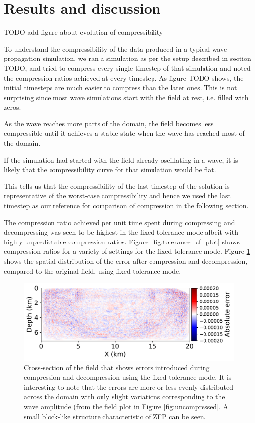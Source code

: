 \section{Results and discussion}
\label{sec:results}

TODO add figure about evolution of compressibility 

To understand the compressibility of the data produced in a typical
wave-propagation simulation, we ran a simulation as per the setup
described in section TODO, and tried to compress every single timestep
of that simulation and noted the compression ratios achieved at every
timestep. As figure TODO shows, the initial timesteps are much easier
to compress than the later ones. This is not surprising since most
wave simulations start with the field at rest, i.e. filled with zeros.

As the wave reaches more parts of the domain, the field becomes less
compressible until it achieves a stable state when the wave has
reached most of the domain. 

If the simulation had started with the field already oscillating in a
wave, it is likely that the compressibility curve for that simulation
would be flat. 

This tells us that the compressibility of the last timestep of the
solution is representative of the worst-case compressibility and hence
we used the last timestep as our reference for comparison of
compression in the following section. 

The compression ratio achieved per unit time spent during compressing
and decompressing was seen to be highest in the fixed-tolerance mode
albeit with highly unpredictable compression ratios. Figure~\ref{fig:tolerance_cf_plot} shows compression ratios for a variety of
settings for the fixed-tolerance mode. Figure
\ref{fig:decompressed_error} shows the spatial distribution of the
error after compression and decompression, compared to the original
field, using fixed-tolerance mode.
\begin{figure}
\begin{center}
\includegraphics[width=0.8\linewidth]{images/errors.pdf}
\end{center}
\caption{Cross-section of the field that shows errors introduced
  during compression and decompression using the fixed-tolerance
  mode. It is interesting to note that the errors are more or less
  evenly distributed across the domain with only slight variations
  corresponding to the wave amplitude (from the field plot in Figure
  \ref{fig:uncompressed}. A small block-like structure characteristic of
  ZFP can be seen.}
\label{fig:decompressed_error}
\end{figure}


